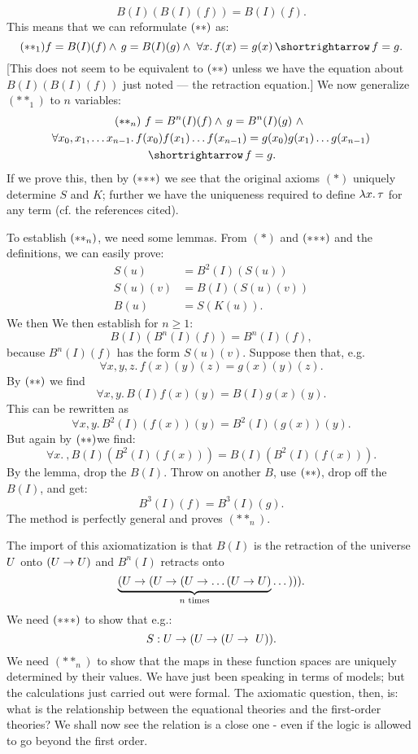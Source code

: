 $$
B(I)(B(I)(f)) = B(I)(f).
$$
This means that we can reformulate $\ss$ as:
$$
(**_1) f = B(I)(f) \land\, g = B(I)(g) \land\,\, \forall x.\,f(x) = g(x)	\, \imp\, f = g.
$$
[This does not seem to be equivalent to $\ss$ unless we have the
equation about $B(I)(B(I)(f))$ just noted --- the retraction equation.] We now generalize $(**_1)$ to $n$ variables:
\begin{multline*}
\ssn \,\,
f = B^n(I)(f) \land\, g = B^n(I)(g) \,\,\land\,\, \\
\forall x_0, x_1, \dots x_{n-1}.\,f(x_0)f(x_1)\dots f(x_{n-1}) = g(x_0)g(x_1)\dots g(x_{n-1})\\
 \, \imp\, f = g.
\end{multline*}
If we prove this, then by $\sss$ we see that the original axioms $(*)$ uniquely determine $S$ and $K$; further we have the uniqueness required to define $\lm{x}.\tau$ for any term (cf. the references cited).

To establish $\ssn$, we need some lemmas.  From $(*)$ and $\sss$ and the definitions, we can easily prove:
\begin{align*}
S(u) &= B^2(I)(S(u))\\
S(u)(v) &= B(I)(S(u)(v))\\
B(u) &= S(K(u)).
\end{align*}
%
We then We then establish for $n\geq 1$:
$$
B(I)(B^n(I)(f)) = B^n(I)(f),
$$
because $B^n(I)(f)$ has the form $S(u)(v)$. Suppose then that, e.g.
$$
\forall x, y, z .\, f(x)(y)(z) = g(x)(y)(z).
$$
By $\ss$ we find
$$
\forall x, y. \, B(I)f(x)(y) = B(I)g(x)(y).
$$
This can be rewritten as
$$
\forall x,y. \, B^2(I)(f(x))(y) = B^2(I)(g(x))(y).
$$
But again by $\ss$we find:
$$
\forall x.\ , B(I)(B^2(I)(f(x)))=B(I)(B^2(I)(f(x))).
$$
By the lemma, drop the $B(I)$. Throw on another $B$, use $\ss$, drop off the $B(I)$, and get:
$$
B^3(I)(f) = B^3(I)(g).
$$
The method is perfectly general and proves $(**_n)$.

The import of this axiomatization is that $B(I)$ is the retraction of the universe $\U$ onto $(\U \to \U)$ and $B^n (I)$ retracts onto
$$
\underbrace{(\U \to (\U \to (\U \to \dots (\U \to \U)}_{n {\textrm{ times}}} \dots ))).
$$
We need $\sss$ to show that e.g.:
$$
S: \U \to (\U \to (\U \to\ U)).
$$
We need $(**_n)$ to show that the maps in these function spaces are uniquely determined by their values.
We have just been speaking in terms of models; but the calculations just carried out were formal. The axiomatic question, then, is: what is the relationship between the equational theories and the first-order theories? We shall now see the relation is a close one - even if the logic is allowed to go beyond the first order.


